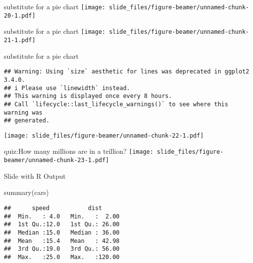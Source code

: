 \documentclass[
  ignorenonframetext,
]{beamer}
\newenvironment{Shaded}{\begin{snugshade}}{\end{snugshade}}
\newcommand{\FunctionTok}[1]{\textcolor[rgb]{0.00,0.00,0.00}{#1}}
\newcommand{\NormalTok}[1]{#1}
\let\oldShaded\Shaded
\let\endoldShaded\endShaded
\renewenvironment{Shaded}{\footnotesize\oldShaded}{\endoldShaded}
\begin{document}
\begin{frame}{substitute for a pie chart}
\protect\hypertarget{substitute-for-a-pie-chart}{}
\texttt{[image: slide\_files/figure-beamer/unnamed-chunk-20-1.pdf]}
\end{frame}

\begin{frame}{substitute for a pie chart}
\protect\hypertarget{substitute-for-a-pie-chart-1}{}
\texttt{[image: slide\_files/figure-beamer/unnamed-chunk-21-1.pdf]}
\end{frame}

\begin{frame}[fragile]{substitute for a pie chart}
\protect\hypertarget{substitute-for-a-pie-chart-2}{}
\begin{verbatim}
## Warning: Using `size` aesthetic for lines was deprecated in ggplot2 3.4.0.
## i Please use `linewidth` instead.
## This warning is displayed once every 8 hours.
## Call `lifecycle::last_lifecycle_warnings()` to see where this warning was
## generated.
\end{verbatim}

\texttt{[image: slide\_files/figure-beamer/unnamed-chunk-22-1.pdf]}
\end{frame}

\begin{frame}{quiz:How many millions are in a trillion?}
\protect\hypertarget{quizhow-many-millions-are-in-a-trillion-2}{}
\texttt{[image: slide\_files/figure-beamer/unnamed-chunk-23-1.pdf]}
\end{frame}

\begin{frame}[fragile]{Slide with R Output}
\protect\hypertarget{slide-with-r-output}{}
\begin{Shaded}
\begin{Highlighting}[]
\FunctionTok{summary}\NormalTok{(cars)}
\end{Highlighting}
\end{Shaded}

\begin{verbatim}
##      speed           dist       
##  Min.   : 4.0   Min.   :  2.00  
##  1st Qu.:12.0   1st Qu.: 26.00  
##  Median :15.0   Median : 36.00  
##  Mean   :15.4   Mean   : 42.98  
##  3rd Qu.:19.0   3rd Qu.: 56.00  
##  Max.   :25.0   Max.   :120.00
\end{verbatim}
\end{frame}
\end{document}
